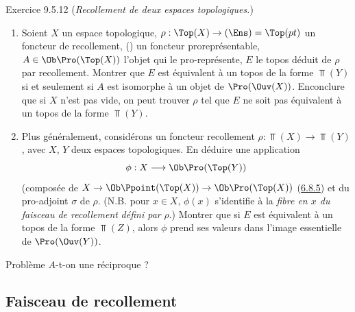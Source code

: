 \documentclass[10pt]{../fichiers-configuration-latex/smfart}
\begin{document}
\begin{enonce*}[remark]{Exercice 9.5.12}
(\emph{Recollement de deux espaces topologiques.})
\begin{enumerate}
\renewcommand{\theenumi}{\alph{enumi}}
\renewcommand{\labelenumi}{\theenumi)}
\item Soient $X$ un espace topologique, $\rho:\Top(X)\rightarrow
(\Ens)=\Top(pt)$ un foncteur de recollement, \ie () un
foncteur proreprésentable, $A\in \Ob \Pro(\Top(X))$ l'objet qui le
pro-représente, $E$ le topos déduit de $\rho$ par recollement.
Montrer que $E$ est équivalent à un topos de la forme $\Top(Y)$ si
et seulement si $A$ est isomorphe à un objet de $\Pro(\Ouv(X))$.
En\pageoriginale conclure que si $X$ n'est pas vide, on peut trouver
$\rho$ tel que $E$ ne soit pas équivalent à un topos de la forme
$\Top(Y)$.

\item Plus généralement, considérons un foncteur recollement
$\rho:\Top(X)\rightarrow \Top(Y)$, avec $X$, $Y$ deux espaces
topologiques. En déduire une application
$$
\phi:X\longrightarrow \Ob \Pro(\Top(Y))
$$
(composée de $X\rightarrow \Ob \Ppoint(\Top(X))\rightarrow
\Ob\Pro(\Top(X))$ (\hyperref[IV.subsubsec6.8.5]{6.8.5}) et du pro-adjoint
$\sigma$ de $\rho$. (N.B. pour $x\in X$, $\phi(x)$ s'identifie à la
\emph{fibre en $x$ du faisceau de recollement} 
\emph{défini par} $\rho$.) Montrer que si $E$ est équivalent à un
topos de la forme $\Top(Z)$, alors $\phi$ prend ses valeurs dans
l'image essentielle de $\Pro(\Ouv(Y))$.
\end{enumerate}
\end{enonce*}

\begin{enonce*}[remark]{Problème}
$A$-t-on une réciproque ?
\end{enonce*}

\subsection{Faisceau de recollement}
\end{document}
